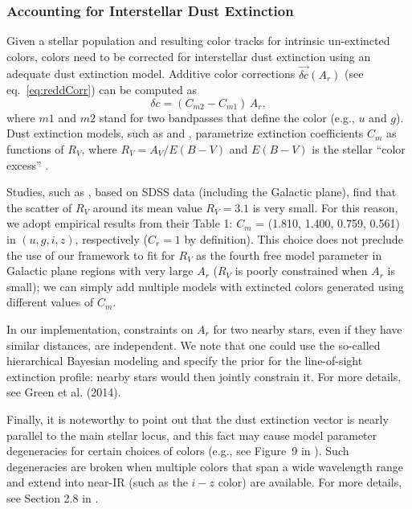 \subsubsection{Accounting for Interstellar Dust Extinction \label{sec:ismdust}} 

Given a stellar population and resulting color tracks for intrinsic un-extincted colors, colors need to
be corrected for interstellar dust extinction using an adequate dust extinction model. Additive color
corrections $\vec{\delta c}(A_r)$ (see eq.~\ref{eq:reddCorr}) can be computed as 
\begin{equation}
 \label{eq:extCorr} 
                      \delta c = (C_{m2}- C_{m1}) \, A_r,
\end{equation}
where $m1$ and $m2$ stand for two bandpasses that define the color (e.g., $u$ and $g$).  
Dust extinction models, such as \cite{1989ApJ...345..245C} and
\cite{1999PASP..111...63F}, parametrize extinction coefficients $C_{m}$ as functions of $R_V$, where
$R_V = A_V/E(B-V)$ and $E(B-V)$ is the stellar ``color excess'' \citep{1989ApJ...345..245C}.

Studies, such as \cite{2012ApJ...757..166B}, based on SDSS data (including the Galactic plane), 
find that the scatter of $R_V$ around its mean value $R_V=3.1$ is very small. For this reason, we adopt
empirical results from their Table 1: $C_m$ = (1.810, 1.400, 0.759, 0.561) in $(u, g, i, z)$, respectively ($C_r=1$
by definition). This choice does not preclude the use of our framework to fit for $R_V$ as the fourth free
model parameter in Galactic plane regions with very large $A_r$ ($R_V$ is poorly constrained when $A_r$ is small);
we  can simply add multiple models with extincted colors generated using different values of $C_m$.

In our implementation, constraints on $A_r$ for two nearby stars, even if they have similar distances,
are independent. We note that one could use the so-called hierarchical Bayesian modeling  and specify the prior
for the line-of-sight extinction profile: nearby stars would then jointly constrain it. For more
details, see Green et al. (2014).

Finally, it is noteworthy to point out that the dust extinction vector is nearly parallel to the main stellar locus,
and this fact may cause model parameter degeneracies for certain choices of colors (e.g., see Figure~9 in
\citealt{2012ApJ...757..166B}). Such degeneracies are broken when multiple colors that span a wide
wavelength range and extend into near-IR (such as the $i-z$ color) are available. For more details, see
Section 2.8 in \cite{2012ApJ...757..166B}.


